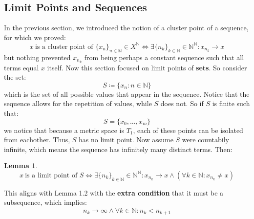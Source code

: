 \documentclass[10pt,letterpaper]{article} %
\newtheorem{lem}{Lemma}[section]
\begin{document}
\subsection{Limit Points and Sequences}
In the previous section, we introduced the notion of a cluster point of a sequence, for which we proved:
\begin{equation*}
x \ \text{is a cluster point of } \{x_n\}_{n \in \mathbb{N}} \in X^\mathbb{N} \iff \exists \{n_k\}_{k \in \mathbb{N}} \in \mathbb{N}^\mathbb{N}: x_{n_k} \xrightarrow{} x
\end{equation*}
but nothing prevented $x_{n_k}$ from being perhaps a constant sequence such that all terms equal $x$ itself. Now this section focused on limit points of \textbf{sets}. So consider the set:
\begin{equation*}
S \coloneq \{x_n : n \in \mathbb{N}\}
\end{equation*}
which is the set of all possible values that appear in the sequence. Notice that the sequence allows for the repetition of values, while $S$ does not. So if $S$ is finite such that:
\begin{equation*}
S = \{x_0, ..., x_m\}
\end{equation*}
we notice that because a metric space is $T_1$, each of these points can be isolated from eachother. Thus, $S$ has no limit point. Now assume $S$ were countabily infinite, which means the sequence has infinitely many distinct terms. Then:
\begin{lem}
\begin{equation*}
x \ \text{is a limit point of } S \iff \exists \{n_k\}_{k \in \mathbb{N}} \in \mathbb{N}^\mathbb{N}: x_{n_k} \xrightarrow{} x \land (\forall k \in \mathbb{N}: x_{n_k} \neq x)
\end{equation*}
\end{lem}
This aligns with Lemma 1.2 with the \textbf{extra condition} that it must be a subsequence, which implies:
\begin{equation*}
n_k \xrightarrow{} \infty \land \forall k \in \mathbb{N}: n_k < n_{k+1}
\end{equation*}
\end{document}
